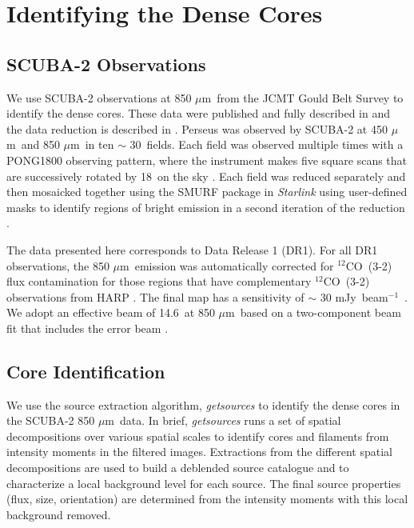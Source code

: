 \documentclass[usenatbib,a4paper]{mnras}
\newcommand{\Jybeam}{\mbox{Jy beam$^{-1}$}}%
\newcommand{\um}{\mbox{$\mu$m}}%
\newcommand{\CO}{\mbox{$^{12}$CO}}
\begin{document}
\section{Identifying the Dense Cores} \label{cores}

\subsection{SCUBA-2 Observations}

We use SCUBA-2 observations at 850 \um\ from the JCMT Gould Belt Survey \citep{Ward-T07} to identify the dense cores.  These data were published and fully described in \citet{MChen16} and the data reduction is described in \citet{Mairs15}.  Perseus was observed by SCUBA-2 at 450 \um\ and 850 \um\ in ten $\sim$ 30\arcmin\ fields.  Each field was observed multiple times with a PONG1800 observing pattern, where the instrument makes five square scans that are successively rotated by 18\degree\ on the sky \citep[see][]{Kackley10, Holland13, Bintley14}.  Each field was reduced separately and then mosaicked together using the SMURF package in \emph{Starlink} \citep[][]{Jenness11, Chapin13, Currie14} using user-defined masks to identify regions of bright emission in a second iteration of the reduction \citep[e.g., see][]{Mairs15}.

The data presented here corresponds to Data Release 1 (DR1).  For all DR1 observations, the 850 \um\ emission was automatically corrected for \CO\ (3-2) flux contamination \citep[e.g., see][]{Drabek12} for those regions that have complementary \CO\ (3-2) observations from HARP \citep[e.g., NGC1333, IC348, L1448, L1455, B1;][]{Buckle09, Curtis10, Sadavoy13}.   The final map has a sensitivity of $\sim$ 30 m\Jybeam\ \citep{MChen16}.  We adopt an effective beam of 14.6\arcsec\ at 850 \um\ based on a two-component beam fit that includes the error beam \citep{Dempsey13}.


\subsection{Core Identification}\label{coreID}

We use the source extraction algorithm, \emph{getsources} \citep{getsources, getsources+filaments} to identify the dense cores in the SCUBA-2 850 \um\ data.  In brief, \emph{getsources} runs a set of spatial decompositions over various spatial scales to identify cores and filaments from intensity moments in the filtered images.  Extractions from the different spatial decompositions are used to build a deblended source catalogue and to characterize a local background level  for each source.  The final source properties (flux, size, orientation) are determined from the intensity moments with this local background removed.  
\end{document}
